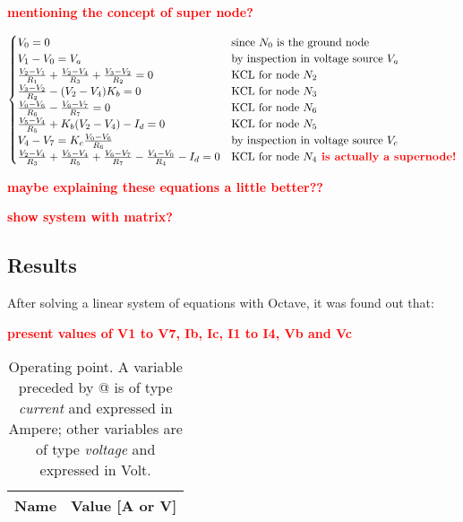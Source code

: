 \par
\textcolor{red}{\textbf{mentioning the concept of super node?}}



\begin{equation}
\begin{cases}
V_0 = 0 & \mbox{since $N_0$ is the ground node} \\
V_1-V_0 = V_a & \mbox{by inspection in voltage source $V_a$}  \\
\frac{V_2-V_1}{R_1} + \frac{V_2-V_4}{R_3} + \frac{V_3-V_2}{R_2} = 0 & \mbox{KCL for node $N_2$} \\
\frac{V_3-V_2}{R_2} - (V_2-V_4) K_b = 0 & \mbox{KCL for node $N_3$} \\
\frac{V_0-V_6}{R_6} - \frac{V_6-V_7}{R_7} = 0 & \mbox{KCL for node $N_6$}\\
\frac{V_5-V_4}{R_5} + K_b (V_2 - V_4) - I_d = 0 & \mbox{KCL for node $N_5$}\\
V_4-V_7 = K_c \frac{V_0-V_6}{R_6} & \mbox{by inspection in voltage source $V_c$} \\
\frac{V_2-V_4}{R_3} + \frac{V_5-V_4}{R_5} +  \frac{V_6-V_7}{R_7} - \frac{V_4-V_0}{R_4} - I_d = 0 & \mbox{KCL for node $N_4$} \textcolor{red}{\textbf{     is actually a supernode!}}
\end{cases}
\end{equation}

\par
\textcolor{red}{\textbf{maybe explaining these equations a little better??}}
\par
\textcolor{red}{\textbf{show system with matrix?}}






\subsection{Results}
\par
After solving a linear system of equations with Octave, it was found out that:
\par
\textcolor{red}{\textbf{present values of V1 to V7, Ib, Ic, I1 to I4, Vb and Vc}}


\begin{table}[h]
  \centering
  \begin{tabular}{|c|c|}
    \hline    
    {\bf Name} & {\bf Value [A or V]} \\ \hline
    
  \end{tabular}
  \caption{Operating point. A variable preceded by @ is of type {\em current}
    and expressed in Ampere; other variables are of type {\it voltage} and expressed in
    Volt.}
  \label{tab:op}
\end{table}

